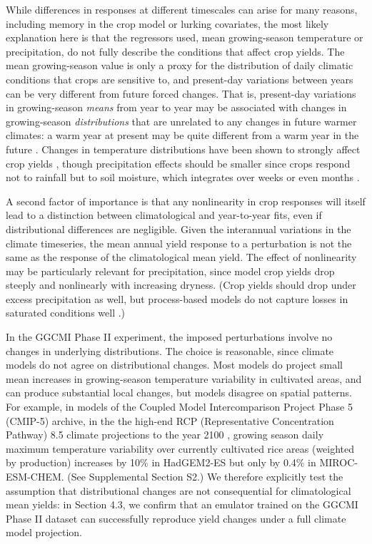 \documentclass[gmd, manuscript]{copernicus} %
\begin{document}
While differences in responses at different timescales can arise for many reasons, including memory in the crop model or lurking covariates, the most likely explanation here is that the regressors used, mean growing-season temperature or precipitation, do not fully describe the conditions that affect crop yields. 
The mean growing-season value is only a proxy for the distribution of daily climatic conditions that crops are sensitive to, and present-day variations between years can be very different from future forced changes. 
That is, present-day variations in growing-season \textit{means} from year to year may be associated with changes in growing-season \textit{distributions} that are unrelated to any changes in future warmer climates: a warm year at present may be quite different from a warm year in the future \citep[e.g.][]{Ruane2016}. %
Changes in temperature distributions have been shown to strongly affect crop yields \citep[e.g.][]{Hansen2000, Gadgil2002}, though precipitation effects should be smaller since crops respond not to rainfall but to soil moisture, which integrates over weeks or even months \citep[e.g.][]{potter2005effects, Glotter14, CHALLINOR200499}. 

A second factor of importance is that any nonlinearity in crop responses will itself lead to a distinction between climatological and year-to-year fits, even if distributional differences are negligible. 
Given the interannual variations in the climate timeseries, the mean annual yield response to a perturbation is not the same as the response of the climatological mean yield. 
The effect of nonlinearity may be particularly relevant for precipitation, since model crop yields drop steeply and nonlinearly with increasing dryness. 
(Crop yields should drop under excess precipitation as well, but process-based models do not capture losses in saturated conditions well \citep{Glotter15,Li2019}.) 

In the GGCMI Phase II experiment, the imposed perturbations involve no changes in underlying distributions.
The choice is reasonable, since climate models do not agree on distributional changes.
Most models do project small mean increases in growing-season temperature variability in cultivated areas, and can produce substantial local changes, but models disagree on spatial patterns.
For example, in models of the Coupled Model Intercomparison Project Phase 5 (CMIP-5) archive, in the the high-end RCP (Representative Concentration Pathway) 8.5 climate projections to the year 2100 \citep{riahi2011rcp}, growing season daily maximum temperature variability over currently cultivated rice areas (weighted by production) increases by 10\% in HadGEM2-ES but only by 0.4\% in MIROC-ESM-CHEM. (See Supplemental Section S2.)
We therefore explicitly test the assumption that distributional changes are not consequential for climatological mean yields: in Section 4.3, we confirm that an emulator trained on the GGCMI Phase II dataset can successfully reproduce yield changes under a full climate model projection.
\end{document}
